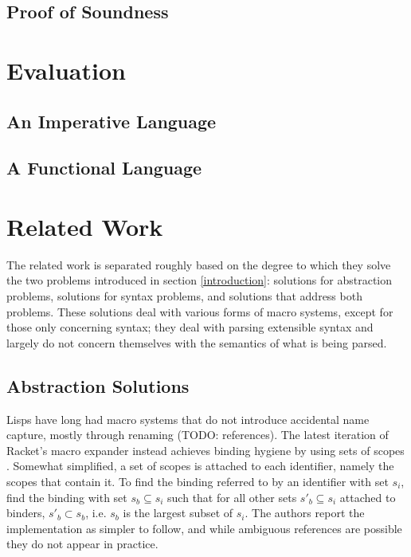 \documentclass{kththesis}
\begin{document}
\section{Proof of Soundness} \label{sec:proof-no-errors}

\chapter{Evaluation}

\section{An Imperative Language} \label{sec:imperative-eval}

\section{A Functional Language} \label{sec:functional-eval}

\chapter{Related Work}

The related work is separated roughly based on the degree to which they solve the two problems introduced in section \ref{introduction}: solutions for abstraction problems, solutions for syntax problems, and solutions that address both problems. These solutions deal with various forms of macro systems, except for those only concerning syntax; they deal with parsing extensible syntax and largely do not concern themselves with the semantics of what is being parsed.

\section{Abstraction Solutions} \label{sec:abstraction-solutions}

Lisps have long had macro systems that do not introduce accidental name capture, mostly through renaming (TODO: references). The latest iteration of Racket's \cite{plt-tr1} macro expander instead achieves binding hygiene by using sets of scopes \cite{Flatt:2016:BSS:2837614.2837620}. Somewhat simplified, a set of scopes is attached to each identifier, namely the scopes that contain it. To find the binding referred to by an identifier with set $s_i$, find the binding with set $s_b \subseteq s_i$ such that for all other sets $s'_b \subseteq s_i$ attached to binders, $s'_b \subset s_b$, i.e. $s_b$ is the largest subset of $s_i$. The authors report the implementation as simpler to follow, and while ambiguous references are possible they do not appear in practice.
\end{document}
